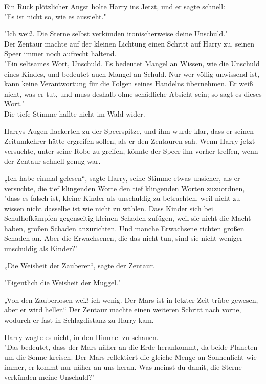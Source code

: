 {Ein Ruck plötzlicher Angst holte Harry ins Jetzt, und er sagte schnell:\\ "Es ist nicht so, wie es aussieht."

"Ich weiß. Die Sterne selbst verkünden ironischerweise deine Unschuld."\\ Der Zentaur machte auf der kleinen Lichtung einen Schritt auf Harry zu, seinen Speer immer noch aufrecht haltend.\\ "Ein seltsames Wort, Unschuld. Es bedeutet Mangel an Wissen, wie die Unschuld eines Kindes, und bedeutet auch Mangel an Schuld. Nur wer völlig unwissend ist, kann keine Verantwortung für die Folgen seines Handelns übernehmen. Er weiß nicht, was er tut, und muss deshalb ohne schädliche Absicht sein; so sagt es dieses Wort."\\ Die tiefe Stimme hallte nicht im Wald wider.

Harrys Augen flackerten zu der Speerspitze, und ihm wurde klar, dass er seinen Zeitumkehrer hätte ergreifen sollen, als er den Zentauren sah. Wenn Harry jetzt versuchte, unter seine Robe zu greifen, könnte der Speer ihn vorher treffen, wenn der Zentaur schnell genug war.

„Ich habe einmal gelesen“, sagte Harry, seine Stimme etwas unsicher, als er versuchte, die tief klingenden Worte den tief klingenden Worten zuzuordnen,\\ "dass es falsch ist, kleine Kinder als unschuldig zu betrachten, weil nicht zu wissen nicht dasselbe ist wie nicht zu wählen. Dass Kinder sich bei Schulhofkämpfen gegenseitig kleinen Schaden zufügen, weil sie nicht die Macht haben, großen Schaden anzurichten. Und manche Erwachsene richten großen Schaden an. Aber die Erwachsenen, die das nicht tun, sind sie nicht weniger unschuldig als Kinder?"

„Die Weisheit der Zauberer“, sagte der Zentaur.

"Eigentlich die Weisheit der Muggel."

„Von den Zauberlosen weiß ich wenig. Der Mars ist in letzter Zeit trübe gewesen, aber er wird heller.“ Der Zentaur machte einen weiteren Schritt nach vorne, wodurch er fast in Schlagdistanz zu Harry kam.

Harry wagte es nicht, in den Himmel zu schauen.\\ "Das bedeutet, dass der Mars näher an die Erde herankommt, da beide Planeten um die Sonne kreisen. Der Mars reflektiert die gleiche Menge an Sonnenlicht wie immer, er kommt nur näher an uns heran. Was meinst du damit, die Sterne verkünden meine Unschuld?"

}
